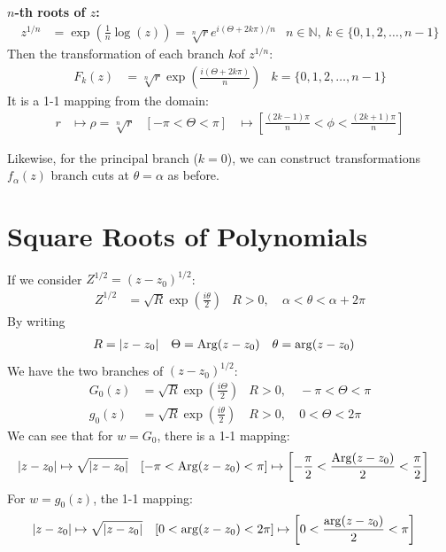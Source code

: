 \documentclass[12pt, english]{book}
\begin{document}
	\textbf{\(n\)-th roots of \(z\):}\newline
	\begin{align*}
		z^{1/n} &= \exp(\frac{1}{n} \log(z)) = \sqrt[n]{r} e^{i(\Theta + 2k\pi)/n}
			& n \in \mathbb{N}, \ k \in \{0, 1, 2, \ldots, n-1\}
	\end{align*}
	Then the transformation of each branch \(k\)of \(z^{1/n}\):
	\begin{align*}
		F_k(z) &= \sqrt[n]{r} \exp(\frac{i(\Theta + 2k\pi)}{n})
			& k= \{0, 1, 2, \ldots, n-1\}
	\end{align*}
	It is a 1-1 mapping from the domain:
	\begin{align*}
		r &\mapsto \rho = \sqrt[n]{r} &
		\left[-\pi < \Theta < \pi\right] &\mapsto \left[\frac{(2k-1)\pi}{n} < \phi < \frac{(2k+1)\pi}{n}\right]
	\end{align*}
	
	Likewise, for the principal branch (\(k=0\)), we can construct transformations \(f_\alpha(z)\) branch cuts at \(\theta = \alpha\) as before.
	
	\section{Square Roots of Polynomials} \label{Square Roots of Polynomials Section - Complex}
	
	\begin{example}
		If we consider \(Z^{1/2} = (z - z_0)^{1/2}\):
		\begin{align*}
			Z^{1/2} &= \sqrt{R} \exp(\frac{i\theta}{2})
				& R>0, &\ \alpha < \theta < \alpha + 2\pi
		\end{align*}
		By writing 
		\begin{align*}
			R &= \abs{z-z_0} &
			\Theta &= \operatorname{Arg}(z - z_0) &
			\theta &= \arg(z-z_0)
		\end{align*}
		We have the two branches of \((z-z_0)^{1/2}\):
		\begin{align*}
			G_0(z) &= \sqrt{R} \exp(\frac{i\Theta}{2})	&
				R>0, &\ -\pi < \Theta < \pi \\
			g_0(z) &= \sqrt{R} \exp(\frac{i\theta}{2})	&
				R>0, &\ 0 < \Theta < 2\pi
		\end{align*}
		We can see that for \(w = G_0\), there is a 1-1 mapping:
		\begin{align*}
			\abs{z-z_0} &\mapsto \sqrt{\abs{z-z_0}}
				& \left[-\pi < \operatorname{Arg}(z-z_0) < \pi \right] &\mapsto
					\left[-\frac{\pi}{2} < \frac{\operatorname{Arg}(z-z_0)}{2} < \frac{\pi}{2}\right]
		\end{align*}
		For \(w = g_0(z)\), the 1-1 mapping:
		\begin{align*}
			\abs{z-z_0} &\mapsto \sqrt{\abs{z-z_0}}
				& \left[0 < \arg(z-z_0) < 2\pi \right] &\mapsto
					\left[0 < \frac{\arg(z-z_0)}{2} < \pi \right]
		\end{align*}
	\end{example}
\end{document}
